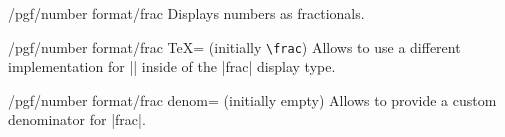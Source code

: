 \documentclass[a4paper]{ltxdoc}
\begin{document}
\begin{key}{/pgf/number format/frac}
    Displays numbers as fractionals.
\begin{codeexample}[width=3cm]
\hspace{1em}
\hspace{1em}
\hspace{1em}
\hspace{1em}
\hspace{1em}
\hspace{1em}
\hspace{1em}
\hspace{1em}
\hspace{1em}
\hspace{1em}
\hspace{1em}
\hspace{1em}
\hspace{1em}
\end{codeexample}

    \begin{key}{/pgf/number format/frac TeX= (initially \texttt{\textbackslash frac})}
        Allows to use a different implementation for |\frac| inside of the
        |frac| display type.
    \end{key}

    \begin{key}{/pgf/number format/frac denom= (initially empty)}
        Allows to provide a custom denominator for |frac|.
\begin{codeexample}[width=3cm]
\hspace{1em}
\hspace{1em}
\hspace{1em}
\hspace{1em}
\hspace{1em}
\end{codeexample}
    \end{key}


\end{key}
\end{document}
